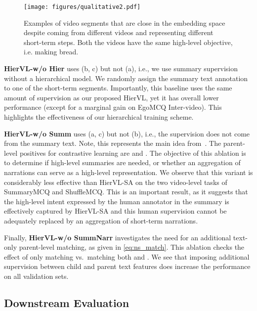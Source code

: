 \documentclass[10pt,twocolumn,letterpaper]{article}
\newcommand{\KAcamera}[1]{{\color{black}{}#1}}
\newcommand{\modelname}[0]{{HierVL}}
\begin{document}
\begin{figure}[t]
\centering
\texttt{[image: figures/qualitative2.pdf]}
\vspace*{-0.12in}
\caption{Examples of video segments that are close in the embedding space despite coming from different videos and representing different short-term steps. Both the videos have the same high-level objective, i.e. making bread.}

\label{fig:qual}
\vspace{-0.10in}
\end{figure}


\textbf{\modelname-w/o Hier} uses (b, c) but not (a), i.e., we use summary supervision without a hierarchical model. We randomly assign the summary text annotation to one of the short-term  segments. Importantly, this baseline uses the same amount of supervision as our proposed \modelname, yet it has overall lower performance (except for a marginal gain on EgoMCQ Inter-video).  This highlights the effectiveness of our hierarchical training scheme. 

\textbf{\modelname-w/o Summ} uses (a, c) but not (b), i.e., the supervision does not come from the summary text. \KAcamera{Note, this represents the main idea from~\cite{cmhse}.}  The parent-level positives for contrastive learning are  and . The objective of this ablation is to determine if high-level summaries are needed, or whether an aggregation of narrations can serve as a high-level representation. We observe that this variant is considerably less effective than \modelname-SA on the two video-level tasks of SummaryMCQ and ShuffleMCQ. This is an important result, as it suggests that the high-level intent expressed by the human annotator in the summary is effectively captured by \modelname-SA and this human supervision cannot be adequately replaced by an aggregation of short-term narrations. 

Finally, \textbf{\modelname-w/o SummNarr} investigates the need for an additional text-only parent-level matching, as given in \cref{eq:ns_match}. This ablation checks the effect of only matching  vs.~matching both  and . We see that imposing additional supervision between child and parent text features does increase the performance on all validation sets. 






\subsection{Downstream Evaluation}
\label{sec:exp-downstream}
\end{document}
